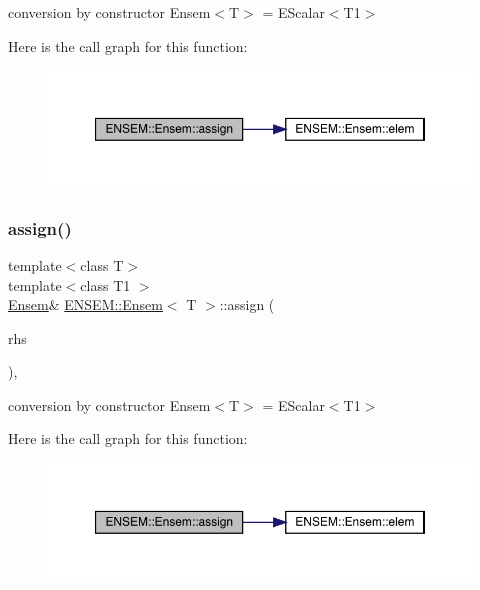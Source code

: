 conversion by constructor Ensem$<$\+T$>$ = E\+Scalar$<$\+T1$>$ 

Here is the call graph for this function\+:
\nopagebreak
\begin{figure}[H]
\begin{center}
\leavevmode
\includegraphics[width=350pt]{d7/d3e/classENSEM_1_1Ensem_aa09448269bc5b72687905254739bf69a_cgraph}
\end{center}
\end{figure}
\mbox{\label{classENSEM_1_1Ensem_aa09448269bc5b72687905254739bf69a}} 
\subsubsection{\texorpdfstring{assign()}{assign()}\hspace{0.1cm}{\footnotesize\ttfamily [3/12]}}
{\footnotesize\ttfamily template$<$class T$>$ \\
template$<$class T1 $>$ \\
\mbox{\hyperlink{classENSEM_1_1Ensem}{Ensem}}\& \mbox{\hyperlink{classENSEM_1_1Ensem}{E\+N\+S\+E\+M\+::\+Ensem}}$<$ T $>$\+::assign (\begin{DoxyParamCaption}\item[{const \mbox{\hyperlink{classENSEM_1_1EScalar}{E\+Scalar}}$<$ T1 $>$ \&}]{rhs }\end{DoxyParamCaption})\hspace{0.3cm}{\ttfamily [inline]}, {\ttfamily [protected]}}



conversion by constructor Ensem$<$\+T$>$ = E\+Scalar$<$\+T1$>$ 

Here is the call graph for this function\+:
\nopagebreak
\begin{figure}[H]
\begin{center}
\leavevmode
\includegraphics[width=350pt]{d7/d3e/classENSEM_1_1Ensem_aa09448269bc5b72687905254739bf69a_cgraph}
\end{center}
\end{figure}
\mbox{\label{classENSEM_1_1Ensem_a43d968c090e5f6c518881cf7ff44d200}} 
